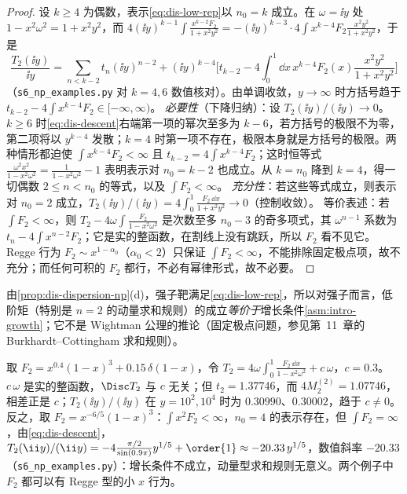 \begin{proof}
设 $k\ge4$ 为偶数，表示\cref{eq:dis-low-rep}以 $n_0=k$ 成立。在 $\omega=\ii y$ 处 $1-x^2\omega^2=1+x^2y^2$，而 $4(\ii y)^{k-1}\int\frac{x^{k-2}F_2}{1+x^2y^2}=-(\ii y)^{k-3}\cdot4\int x^{k-4}F_2\frac{x^2y^2}{1+x^2y^2}$，于是
\begin{equation}\label{eq:dis-descent}
\frac{T_2(\ii y)}{\ii y}=\sum_{n<k-2}t_n(\ii y)^{n-2}+(\ii y)^{k-4}\Big[t_{k-2}-4\int_0^1\dd x\,x^{k-4}F_2(x)\frac{x^2y^2}{1+x^2y^2}\Big]
\end{equation}
（\texttt{s6\_np\_examples.py} 对 $k=4,6$ 数值核对）。由单调收敛，$y\to\infty$ 时方括号趋于 $t_{k-2}-4\int x^{k-4}F_2\in[-\infty,\infty)$。
\emph{必要性}（下降归纳）：设 $T_2(\ii y)/(\ii y)\to0$。$k\ge6$ 时\cref{eq:dis-descent}右端第一项的幂次至多为 $k-6$，若方括号的极限不为零，第二项将以 $y^{k-4}$ 发散；$k=4$ 时第一项不存在，极限本身就是方括号的极限。两种情形都迫使 $\int x^{k-4}F_2<\infty$ 且 $t_{k-2}=4\int x^{k-4}F_2$；这时恒等式 $\frac{\omega^2x^2}{1-x^2\omega^2}=\frac1{1-x^2\omega^2}-1$ 表明表示对 $n_0=k-2$ 也成立。从 $k=n_0$ 降到 $k=4$，得一切偶数 $2\le n<n_0$ 的等式，以及 $\int F_2<\infty$。
\emph{充分性}：若这些等式成立，则表示对 $n_0=2$ 成立，$T_2(\ii y)/(\ii y)=4\int_0^1\frac{F_2\,\dd x}{1+x^2y^2}\to0$（控制收敛）。
等价表述：若 $\int F_2<\infty$，则 $T_2-4\omega\int\frac{F_2}{1-x^2\omega^2}$ 是次数至多 $n_0-3$ 的奇多项式，其 $\omega^{n-1}$ 系数为 $t_n-4\int x^{n-2}F_2$；它是实的整函数，在割线上没有跳跃，所以 $F_2$ 看不见它。Regge 行为 $F_2\sim x^{1-\alpha_0}$（$\alpha_0<2$）只保证 $\int F_2<\infty$，不能排除固定极点项，故不充分；而任何可积的 $F_2$ 都行，不必有幂律形式，故不必要。
\end{proof}

由\cref{prop:dis-dispersion-np}(d)，强子靶满足\cref{eq:dis-low-rep}，所以对强子而言，低阶矩（特别是 $n=2$ 的动量求和规则）的成立\emph{等价于}增长条件\cref{asm:intro-growth}；它不是 Wightman 公理的推论（固定极点问题，参见第~11~章的 Burkhardt--Cottingham 求和规则）。

\begin{example}[固定极点与不可积的 $F_2$]\label{ex:dis-fixed-pole}
取 $F_2=x^{0.4}(1-x)^3+0.15\,\delta(1-x)$，令 $T_2=4\omega\int_0^1\frac{F_2\,\dd x}{1-x^2\omega^2}+c\,\omega$，$c=0.3$。$c\,\omega$ 是实的整函数，$\Disc T_2$ 与 $c$ 无关；但 $t_2=1.37746$，而 $4M^{(2)}_2=1.07746$，相差正是 $c$；$T_2(\ii y)/(\ii y)$ 在 $y=10^2,10^4$ 时为 $0.30990$、$0.30002$，趋于 $c\ne0$。反之，取 $F_2=x^{-6/5}(1-x)^3$：$\int x^2F_2<\infty$，$n_0=4$ 的表示存在，但 $\int F_2=\infty$，由\cref{eq:dis-descent}，$T_2(\ii y)/(\ii y)=-4\frac{\pi/2}{\sin(0.9\pi)}y^{1/5}+\order{1}\approx-20.33\,y^{1/5}$，数值斜率 $-20.33$（\texttt{s6\_np\_examples.py}）：增长条件不成立，动量型求和规则无意义。两个例子中 $F_2$ 都可以有 Regge 型的小 $x$ 行为。
\end{example}

